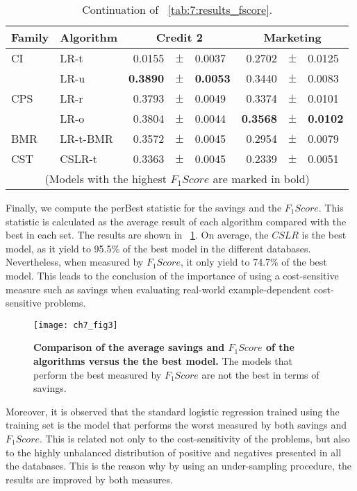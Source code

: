 \begin{table}
    \centering
    \footnotesize
    \begin{tabular}{l l r@{\hskip 0in}c@{\hskip 0in}l r@{\hskip 0in}c@{\hskip 0in}l  } %
    \hline
    \bf{Family} & \bf{Algorithm} &  \multicolumn{3}{c}{\bf{Credit 2}} 
& \multicolumn{3}{c}{\bf{Marketing}} \\ 
    \hline
CI&LR-t & 0.0155 &$\pm$& 0.0037 & 0.2702 &$\pm$& 0.0125\\ 
&LR-u & \bf{0.3890} &\bf{$\pm$}& \bf{0.0053} & 0.3440 &$\pm$& 0.0083\\ 
\hline 
CPS&LR-r & 0.3793 &$\pm$& 0.0049 & 0.3374 &$\pm$& 0.0101\\ 
&LR-o & 0.3804 &$\pm$& 0.0044 & \bf{0.3568} &\bf{$\pm$}& \bf{0.0102}\\ 
\hline 
BMR&LR-t-BMR & 0.3572 &$\pm$& 0.0045 & 0.2954 &$\pm$& 0.0079\\ 
\hline 
CST&CSLR-t & 0.3363 &$\pm$& 0.0045 & 0.2339 &$\pm$& 0.0051\\ 
\hline 
  \multicolumn{8}{c}{(Models with the highest $F_1Score$ are marked in bold)}
  \end{tabular}
    \caption{Continuation of \tablename{~\ref{tab:7:results_fscore}}.}
    \label{tab:7:results_fscore2}
  \end{table}
  
Finally, we compute the perBest statistic  for the savings and the $F_1Score$. This statistic is 
calculated as the average result of each algorithm compared with the best in each set. The results 
are shown in \figurename{~\ref{fig:7:comparison_per_best}}. On average, the $CSLR$ is the best 
model, as it yield to 95.5\% of the best model in the different databases. Nevertheless, when 
measured by $F_1Score$, it only yield to 74.7\% of the best model. This leads to the conclusion 
of the importance of using a cost-sensitive measure such as savings when evaluating real-world 
example-dependent cost-sensitive problems. 

\begin{figure}[t!] 
  \centering
  \texttt{[image: ch7\_fig3]}
  \caption{\textbf{Comparison of the average savings and $F_1Score$ of the algorithms versus the 
    the best model.} The models that perform the best measured by $F_1Score$ are not the best 
  in terms of savings.}
  \label{fig:7:comparison_per_best}
\end{figure}

Moreover, it is observed that the standard logistic regression trained using the training set is 
the model that performs the worst measured by both savings and $F_1Score$. This is related not only 
to the cost-sensitivity of the problems, but also to the highly unbalanced distribution of positive 
and negatives presented in all the databases. This is the reason why by using an under-sampling 
procedure, the results are improved by both measures.